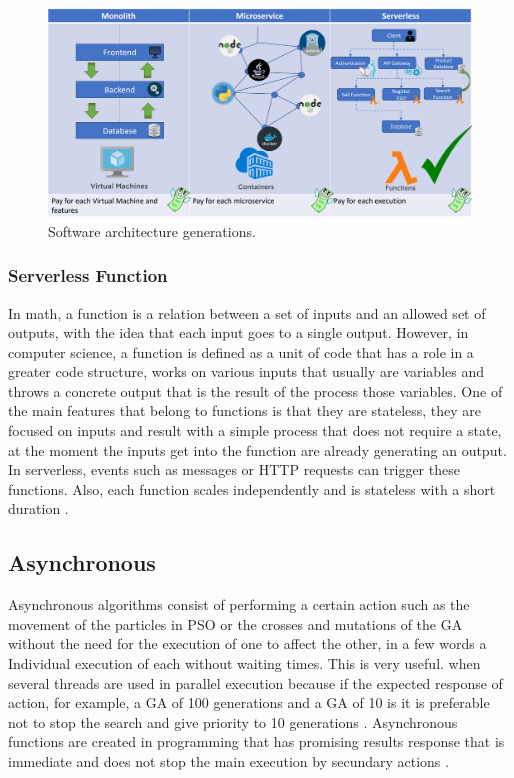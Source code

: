 \documentclass[runningheads]{llncs}
\begin{document}
\begin{figure}[htp]
  \includegraphics[width=\textwidth]{img/architectures.png}
  \caption{Software architecture generations.} \label{fig1}
  \end{figure}

\subsubsection{Serverless Function} 
In math, a function is a relation between a set of inputs and an allowed set of
outputs, with the idea that each input goes to a single output. However, in
computer science, a function is defined as a unit of code that has a role in a
greater code structure, works on various inputs that usually are variables and throws a concrete
output that is the result of the process those variables. One of the main features that belong to
functions is that they are stateless, they are focused on inputs and result with a simple process
that does not require a state, at the moment the inputs get into the function are already generating an output. 
In serverless, events such as messages or HTTP requests can trigger these functions. 
Also, each function scales independently and is stateless with a short duration \cite{Baird2016,Cook2017}.

\subsection{Asynchronous}

Asynchronous algorithms consist of performing a certain action
such as the movement of the particles in PSO or the crosses and mutations of the GA
without the need for the execution of one to affect the other, in a few words a
Individual execution of each without waiting times. This is very useful.
when several threads are used in parallel execution because if the expected response of action, for example, a GA of 100 generations and a GA of 10 is
it is preferable not to stop the search and give priority to 10 generations \cite{Santander-jim2018,Sherry2012,Goebel2016,Guerv2018}.
Asynchronous functions are created in programming that has promising results response that is immediate and does not stop the main execution by secundary actions \cite{Moroney2017,Ambler2015}.
\end{document}
